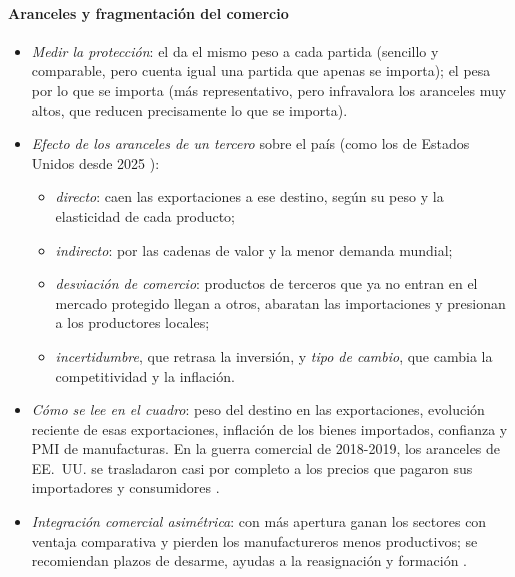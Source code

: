 \documentclass[11pt]{article}
\begin{document}
\paragraph{Aranceles y fragmentación del comercio}
\begin{itemize}
\item \emph{Medir la protección}: el  da el mismo peso a cada partida (sencillo y comparable, pero cuenta igual una partida que apenas se importa); el  pesa por lo que se importa (más representativo, pero infravalora los aranceles muy altos, que reducen precisamente lo que se importa).
\item \emph{Efecto de los aranceles de un tercero} sobre el país (como los de Estados Unidos desde 2025 \parencite{FMI2026WEO}):
  \begin{itemize}
  \item \emph{directo}: caen las exportaciones a ese destino, según su peso y la elasticidad de cada producto;
  \item \emph{indirecto}: por las cadenas de valor y la menor demanda mundial;
  \item \emph{desviación de comercio}: productos de terceros que ya no entran en el mercado protegido llegan a otros, abaratan las importaciones y presionan a los productores locales;
  \item \emph{incertidumbre}, que retrasa la inversión, y \emph{tipo de cambio}, que cambia la competitividad y la inflación.
  \end{itemize}
\item \emph{Cómo se lee en el cuadro}: peso del destino en las exportaciones, evolución reciente de esas exportaciones, inflación de los bienes importados, confianza y PMI de manufacturas. En la guerra comercial de 2018-2019, los aranceles de EE.~UU. se trasladaron casi por completo a los precios que pagaron sus importadores y consumidores \parencite{Amiti2019Aranceles,Fajgelbaum2020Proteccionismo}.
\item \emph{Integración comercial asimétrica}: con más apertura ganan los sectores con ventaja comparativa y pierden los manufactureros menos productivos; se recomiendan plazos de desarme, ayudas a la reasignación y formación   .
\end{itemize}
\end{document}
